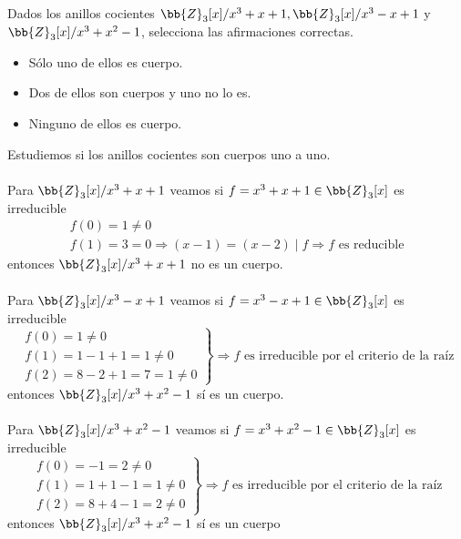 \documentclass[12pt]{article}
\begin{document}
    \begin{ejercicio}[1 punto]
        Dados los anillos cocientes $\bb{Z}_3[x]/x^3 +x +1, \bb{Z}_3[x]/x^3 -x +1$ y $\bb{Z}_3[x]/x^3 +x^2 -1$, selecciona las afirmaciones correctas.
        \begin{itemize}[label=$\square$]
            \item Sólo uno de ellos es cuerpo.
            \item Dos de ellos son cuerpos y uno no lo es.
            \item Ninguno de ellos es cuerpo.
        \end{itemize}  
        Estudiemos si los anillos cocientes son cuerpos uno a uno.\\ \\
        Para $\bb{Z}_3[x]/x^3 +x +1$ veamos si $f =x^3+x+1 \in \bb{Z}_3[x]$ es irreducible
        \begin{equation*}
            \begin{array}{l}
                f(0)=1\neq0 \\
                f(1)=3=0\Longrightarrow (x-1)=(x-2)\mid f\Longrightarrow f \text{ es reducible}
            \end{array}
        \end{equation*}
        entonces $\bb{Z}_3[x]/x^3 +x +1$ no es un cuerpo. \\ \\
        Para $\bb{Z}_3[x]/x^3 -x +1$ veamos si $f =x^3-x+1 \in \bb{Z}_3[x]$ es irreducible
        \begin{equation*}
            \left.\begin{array}{l}
                f(0)=1\neq0 \\
                f(1)=1-1+1=1\neq0\\
                f(2)=8-2+1=7=1\neq0
            \end{array}\right\}  \Longrightarrow f \text{ es irreducible por el criterio de la raíz}
        \end{equation*}
        entonces $\bb{Z}_3[x]/x^3 +x^2 -1$ sí es un cuerpo. \\ \\
        Para $\bb{Z}_3[x]/x^3 +x^2 -1$ veamos si $f =x^3+x^2-1 \in \bb{Z}_3[x]$ es irreducible
        \begin{equation*}
            \left.\begin{array}{l}
                f(0)=-1=2\neq0 \\
                f(1)=1+1-1=1\neq0\\
                f(2)=8+4-1=2\neq0
            \end{array}\right\}  \Longrightarrow f \text{ es irreducible por el criterio de la raíz}
        \end{equation*}
        entonces $\bb{Z}_3[x]/x^3 +x^2 -1$ sí es un cuerpo
    \end{ejercicio}
\end{document}
